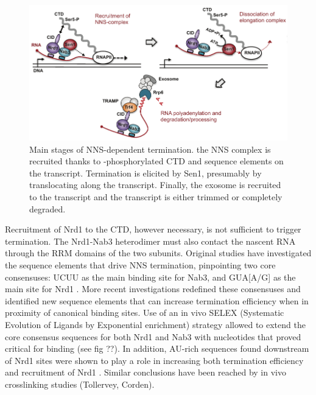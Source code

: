 \begin{figure}[ht]

\centering
\includegraphics[width=\textwidth]{figures/introduction/nns}
\caption[Mechanism of NNS termination]{Main stages of NNS-dependent termination. the NNS complex is recruited thanks to \serf{}-phosphorylated CTD and sequence elements on the transcript. Termination is elicited by Sen1, presumably by translocating along the transcript. Finally, the exosome is recruited to the transcript and the transcript is either trimmed or completely degraded.}
\label{fig:nnsTermination}

\end{figure}

Recruitment of Nrd1 to the CTD, however necessary, is not sufficient to trigger termination. 
The Nrd1-Nab3 heterodimer must also contact the nascent RNA through the RRM domains of the two subunits.
Original studies have investigated the sequence elements that drive NNS termination, pinpointing two core consensuses: UCUU as the main binding site for Nab3, and GUA[A/G] as the main site for Nrd1 \cite{carroll:2004:identification}. 
More recent investigations redefined these consensuses and identified new sequence elements that can increase termination efficiency when in proximity of canonical binding sites. 
Use of an in vivo SELEX (Systematic Evolution of Ligands by Exponential enrichment) strategy allowed to extend the core consensus sequences for both Nrd1 and Nab3 with nucleotides that proved critical for binding (see fig ??). 
In addition, AU-rich sequences found downstream of Nrd1 sites were shown to play a role in increasing both termination efficiency and recruitment of Nrd1 \cite{porrua:2012:in}. Similar conclusions have been reached by in vivo crosslinking studies (Tollervey, Corden).

